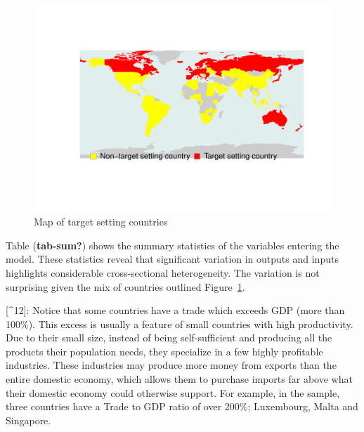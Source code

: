 \documentclass[
  letterpaper,
  DIV=11,
  numbers=noendperiod]{scrartcl}
\begin{document}
\begin{figure}[H]

{\centering \includegraphics{EE_R-R_files/figure-pdf/fig-map-1.pdf}

}

\caption{\label{fig-map}Map of target setting countries}

\end{figure}

Table (\textbf{tab-sum?}) shows the summary statistics of the variables
entering the model. These statistics reveal that significant variation
in outputs and inputs highlights considerable cross-sectional
heterogeneity. The variation is not surprising given the mix of
countries outlined Figure~\ref{fig-map}.

{[}\^{}12{]}: Notice that some countries have a trade which exceeds GDP
(more than 100\%). This excess is usually a feature of small countries
with high productivity. Due to their small size, instead of being
self-sufficient and producing all the products their population needs,
they specialize in a few highly profitable industries. These industries
may produce more money from exports than the entire domestic economy,
which allows them to purchase imports far above what their domestic
economy could otherwise support. For example, in the sample, three
countries have a Trade to GDP ratio of over 200\%; Luxembourg, Malta and
Singapore.
\end{document}

